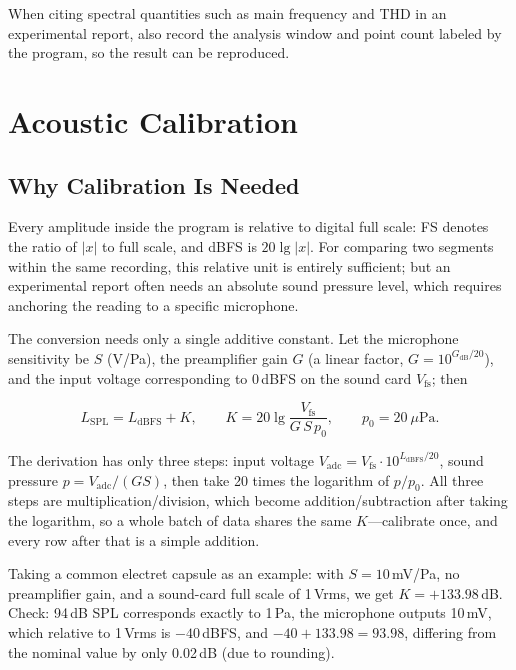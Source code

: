 \documentclass[UTF8,a4paper,12pt]{ctexart}
\begin{document}
When citing spectral quantities such as main frequency and THD in an experimental report, also record the analysis window and point count labeled by the program, so the result can be reproduced.

\section{Acoustic Calibration}

\subsection{Why Calibration Is Needed}

Every amplitude inside the program is relative to digital full scale: FS denotes the ratio of $|x|$ to full scale, and dBFS is $20\lg|x|$. For comparing two segments within the same recording, this relative unit is entirely sufficient; but an experimental report often needs an absolute sound pressure level, which requires anchoring the reading to a specific microphone.

The conversion needs only a single additive constant. Let the microphone sensitivity be $S$ (V/Pa), the preamplifier gain $G$ (a linear factor, $G=10^{G_\mathrm{dB}/20}$), and the input voltage corresponding to 0\,dBFS on the sound card $V_\mathrm{fs}$; then

\begin{equation}
L_\mathrm{SPL} = L_\mathrm{dBFS} + K, \qquad
K = 20\lg\frac{V_\mathrm{fs}}{G\,S\,p_0}, \qquad p_0 = 20\ \mu\mathrm{Pa}.
\label{eq:calib}
\end{equation}

The derivation has only three steps: input voltage $V_\mathrm{adc} = V_\mathrm{fs}\cdot10^{L_\mathrm{dBFS}/20}$, sound pressure $p = V_\mathrm{adc}/(GS)$, then take 20 times the logarithm of $p/p_0$. All three steps are multiplication/division, which become addition/subtraction after taking the logarithm, so a whole batch of data shares the same $K$---calibrate once, and every row after that is a simple addition.

Taking a common electret capsule as an example: with $S=10$\,mV/Pa, no preamplifier gain, and a sound-card full scale of 1\,Vrms, we get $K=+133.98$\,dB. Check: 94\,dB SPL corresponds exactly to 1\,Pa, the microphone outputs 10\,mV, which relative to 1\,Vrms is $-40$\,dBFS, and $-40+133.98=93.98$, differing from the nominal value by only 0.02\,dB (due to rounding).
\end{document}
